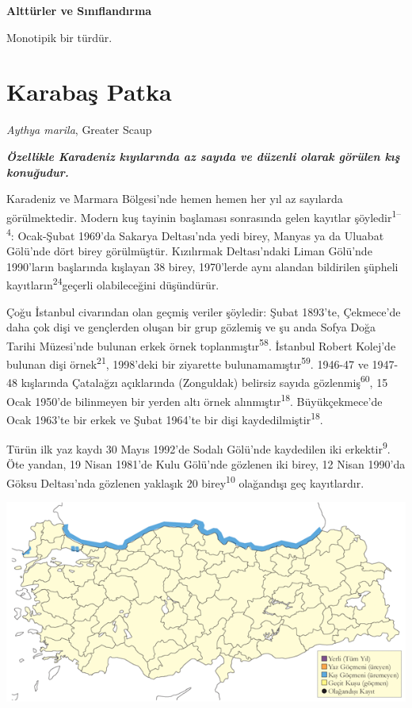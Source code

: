 \documentclass[
  letterpaper,
  DIV=11,
  numbers=noendperiod]{scrreprt}
\begin{document}
\textbf{Alttürler ve Sınıflandırma}

Monotipik bir türdür.

\section{Karabaş Patka}\label{karabaux15f-patka}

\emph{Aythya marila}, Greater Scaup

\textbf{\emph{Özellikle Karadeniz kıyılarında az sayıda ve düzenli
olarak görülen kış konuğudur.}}

Karadeniz ve Marmara Bölgesi'nde hemen hemen her yıl az sayılarda
görülmektedir. Modern kuş tayinin başlaması sonrasında gelen kayıtlar
şöyledir\textsuperscript{1--4}: Ocak-Şubat 1969'da Sakarya Deltası'nda
yedi birey, Manyas ya da Uluabat Gölü'nde dört birey görülmüştür.
Kızılırmak Deltası'ndaki Liman Gölü'nde 1990'ların başlarında kışlayan
38 birey, 1970'lerde aynı alandan bildirilen şüpheli
kayıtların\textsuperscript{24}geçerli olabileceğini düşündürür.

Çoğu İstanbul civarından olan geçmiş veriler şöyledir: Şubat 1893'te,
Çekmece'de daha çok dişi ve gençlerden oluşan bir grup gözlemiş ve şu
anda Sofya Doğa Tarihi Müzesi'nde bulunan erkek örnek
toplanmıştır\textsuperscript{58}. İstanbul Robert Kolej'de bulunan dişi
örnek\textsuperscript{21}, 1998'deki bir ziyarette
bulunamamıştır\textsuperscript{59}. 1946-47 ve 1947-48 kışlarında
Çatalağzı açıklarında (Zonguldak) belirsiz sayıda
gözlenmiş\textsuperscript{60}, 15 Ocak 1950'de bilinmeyen bir yerden
altı örnek alınmıştır\textsuperscript{18}. Büyükçekmece'de Ocak 1963'te
bir erkek ve Şubat 1964'te bir dişi kaydedilmiştir\textsuperscript{18}.

Türün ilk yaz kaydı 30 Mayıs 1992'de Sodalı Gölü'nde kaydedilen iki
erkektir\textsuperscript{9}. Öte yandan, 19 Nisan 1981'de Kulu Gölü'nde
gözlenen iki birey, 12 Nisan 1990'da Göksu Deltası'nda gözlenen yaklaşık
20 birey\textsuperscript{10} olağandışı geç kayıtlardır.

\includegraphics{images/harita_Page_026.png}
\end{document}
